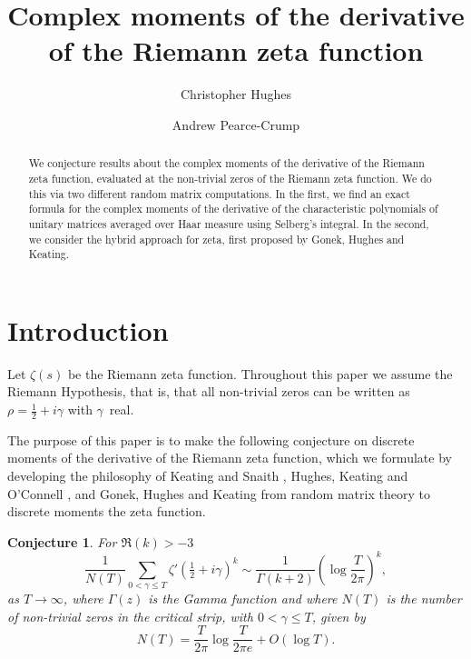 \documentclass[12pt,a4paper,reqno]{amsart}
\newtheorem{conjecture}[theorem]{Conjecture}
\theoremstyle{remark}
\numberwithin{equation}{section}
\begin{document}
\title[Moments of the derivative of zeta]{Complex moments of the derivative of the Riemann zeta function}

\author[C. Hughes]{Christopher Hughes}
\address{Department of Mathematics, University of York, York, YO10 5GH, United Kingdom}
\author[A. Pearce-Crump]{Andrew Pearce-Crump}
\address{School of Mathematics, Fry Building, Woodland Road, Bristol, BS8 1UG, United Kingdom}

\begin{abstract}
We conjecture results about the complex moments of the derivative of the Riemann zeta function, evaluated at the non-trivial zeros of the Riemann zeta function. We do this via two different random matrix computations. In the first, we find an exact formula for the complex moments of the derivative of the characteristic polynomials of unitary matrices averaged over Haar measure using Selberg's integral. In the second, we consider the hybrid approach for zeta, first proposed by Gonek, Hughes and Keating. 
\end{abstract}


\maketitle


\section{Introduction}\label{Sect:Intro}
Let $\zeta (s)$ be the Riemann zeta function. Throughout this paper we assume the Riemann Hypothesis, that is, that all non-trivial zeros can be written as $\rho = \tfrac{1}{2} + i \gamma$ with $\gamma$~real.

The purpose of this paper is to make the following conjecture on discrete moments of the derivative of the Riemann zeta function, which we formulate by developing the philosophy of Keating and Snaith \cite{KS00a}, Hughes, Keating and O'Connell \cite{HKO00}, and Gonek, Hughes and Keating \cite{GHK07} from random matrix theory to discrete moments the zeta function.

\begin{conjecture}\label{conj:n1}
For $\Re(k)>-3$
\begin{equation*}
    \frac{1}{N(T)} \sum_{0 < \gamma \leq T} \zeta' \left( \tfrac{1}{2} + i \gamma \right)^{k} \sim \frac{1}{\Gamma(k +2)} \left( \log \frac{T}{2\pi} \right)^{k},
\end{equation*}
as $T \to \infty$, where $\Gamma (z)$ is the Gamma function and where $N(T)$ is the number of non-trivial zeros in the critical strip, with $0<\gamma\leq T $, given by
\begin{equation*}\label{N(T)}
    N(T) =\frac{T}{2 \pi} \log \frac{T}{2 \pi e} + O(\log T).
\end{equation*}
\end{conjecture}
\end{document}
